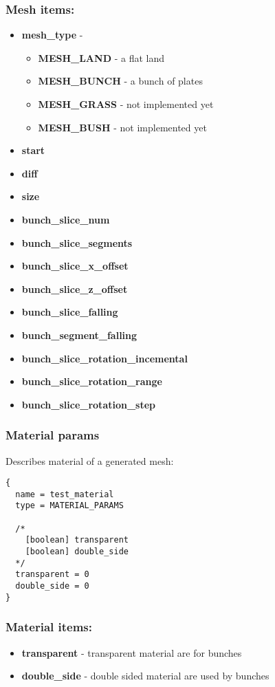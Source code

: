 \documentclass[9pt]{article}
\begin{document}
\subsubsection*{Mesh items:}
\begin{itemize}
\item{\bf mesh\_type} - 
\begin{itemize}
\item{\bf MESH\_LAND} - a flat land
\item{\bf MESH\_BUNCH} - a bunch of plates
\item{\bf MESH\_GRASS} - not implemented yet
\item{\bf MESH\_BUSH} - not implemented yet
\end{itemize}
\item{\bf start}
\item{\bf diff}
\item{\bf size}
\item{\bf bunch\_slice\_num}
\item{\bf bunch\_slice\_segments}
\item{\bf bunch\_slice\_x\_offset}
\item{\bf bunch\_slice\_z\_offset}
\item{\bf bunch\_slice\_falling}
\item{\bf bunch\_segment\_falling}
\item{\bf bunch\_slice\_rotation\_incemental}
\item{\bf bunch\_slice\_rotation\_range}
\item{\bf bunch\_slice\_rotation\_step}
\end{itemize}

\subsubsection{Material params}
Describes material of a generated mesh:
\begin{verbatim}
{
  name = test_material
  type = MATERIAL_PARAMS
  
  /*
    [boolean] transparent
    [boolean] double_side
  */
  transparent = 0
  double_side = 0  
}
\end{verbatim}
\subsubsection*{Material items:}
\begin{itemize}
\item{\bf transparent} - transparent material are for bunches
\item{\bf double\_side} - double sided material are used by bunches
\end{itemize}
\end{document}
